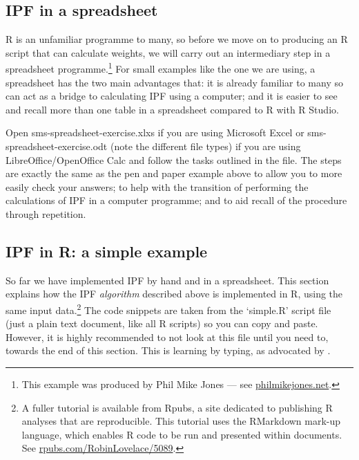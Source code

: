\documentclass[a4paper, 11pt, twoside]{article}
\begin{document}

\subsection{IPF in a spreadsheet}
R is an unfamiliar programme to many, so before we move on to producing an R script that can calculate weights, we will carry out an intermediary step in a spreadsheet programme.\footnote{This
example was produced by Phil Mike Jones --- see \href{http://www.philmikejones.net/}{philmikejones.net}.}
For small examples like the one we are using, a spreadsheet has the two main advantages that: it is already familiar to many so can act as a bridge to calculating IPF using a computer; and it is easier to see and recall more than one table in a spreadsheet compared to R with R Studio.

Open sms-spreadsheet-exercise.xlxs if you are using Microsoft Excel or sms-spreadsheet-exercise.odt (note the different file types) if you are using LibreOffice/OpenOffice Calc and follow the tasks outlined in the file. The steps are exactly the same as the pen and paper example above to allow you to more easily check your answers; to help with the transition of performing the calculations of IPF in a computer programme; and to aid recall of the procedure through repetition.

\subsection{IPF in R: a simple example} \label{simplementing}
So far we have implemented IPF by hand and in a spreadsheet.
This section explains how the IPF
\emph{algorithm} described above is implemented in R, using the
same input data.\footnote{A fuller tutorial is available from Rpubs, a site dedicated
to publishing R analyses that are reproducible. This tutorial uses the RMarkdown
mark-up language, which enables R code to be run and presented within
documents. See \href{http://rpubs.com/RobinLovelace/5089}{rpubs.com/RobinLovelace/5089}\label{fnrpub}.}
The code snippets are taken from the `simple.R' script file (just a plain text
document, like all R scripts) so you can copy and paste. However, it is
highly recommended to not look at this file until you need to, towards
the end of this
section. This is learning by typing, as advocated by \citet{shaw2013learn}.
\end{document}
